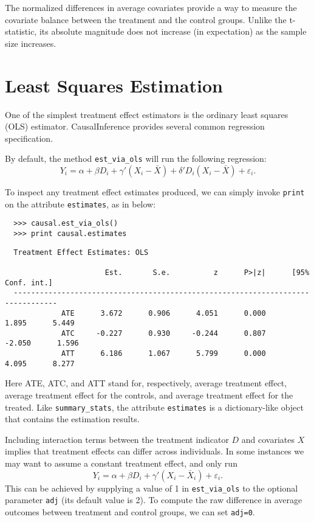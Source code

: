 \documentclass[12pt]{article}
\theoremstyle{definition}
\theoremstyle{definition}
\theoremstyle{definition}
\theoremstyle{remark}
\begin{document}
The normalized differences in average covariates provide a way to measure the covariate balance between the treatment and the control groups. Unlike the t-statistic, its absolute magnitude does not increase (in expectation) as the sample size increases.


\section{Least Squares Estimation}

One of the simplest treatment effect estimators is the ordinary least squares (OLS) estimator. CausalInference provides several common regression specification.

By default, the method \texttt{est\_via\_ols} will run the following regression:
\[Y_i = \alpha + \beta D_i + \gamma' (X_i-\bar{X}) + \delta' D_i (X_i-\bar{X}) + \varepsilon_i.\]

To inspect any treatment effect estimates produced, we can simply invoke \texttt{print} on the attribute \texttt{estimates}, as in below:
\begin{verbatim}
  >>> causal.est_via_ols()
  >>> print causal.estimates
\end{verbatim}
\begin{verbatim}
  Treatment Effect Estimates: OLS
  
                       Est.       S.e.          z      P>|z|      [95% Conf. int.]
  --------------------------------------------------------------------------------
             ATE      3.672      0.906      4.051      0.000      1.895      5.449
             ATC     -0.227      0.930     -0.244      0.807     -2.050      1.596
             ATT      6.186      1.067      5.799      0.000      4.095      8.277
\end{verbatim}
Here ATE, ATC, and ATT stand for, respectively, average treatment effect, average treatment effect for the controls, and average treatment effect for the treated. Like \texttt{summary\_stats}, the attribute \texttt{estimates} is a dictionary-like object that contains the estimation results.

Including interaction terms between the treatment indicator $D$ and covariates $X$ implies that treatment effects can differ across individuals. In some instances we may want to assume a constant treatment effect, and only run
\[Y_i = \alpha + \beta D_i + \gamma' (X_i-\bar{X}_i) + \varepsilon_i.\]
This can be achieved by supplying a value of 1 in \texttt{est\_via\_ols} to the optional parameter \texttt{adj} (its default value is 2). To compute the raw difference in average outcomes between treatment and control groups, we can set \texttt{adj=0}.
\end{document}
